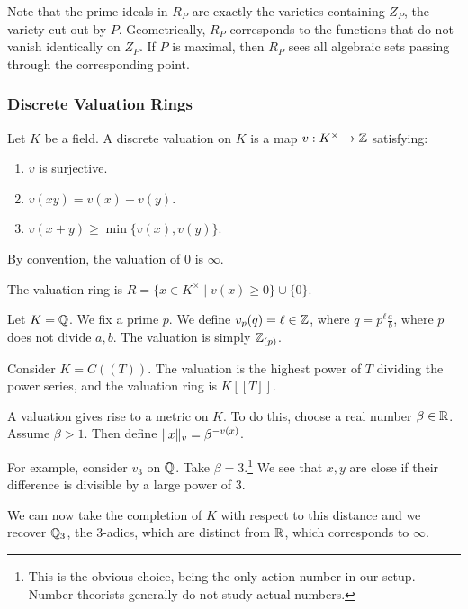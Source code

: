 \documentclass[10pt, twoside]{article}
\begin{document}
        Note that the prime ideals in $R_P$ are exactly the varieties containing $Z_P$, the variety cut out by $P$. Geometrically, $R_P$ corresponds to the functions that do not vanish identically on $Z_P$. If $P$ is maximal, then $R_P$ sees all algebraic sets passing through the corresponding point.

        \subsubsection{Discrete Valuation Rings}
        \begin{defn}
            Let $K$ be a field. A discrete valuation on $K$ is a map $v:K^{\times} \to \mathbb{Z}$ satisfying:
            \begin{enumerate}
                \item $v$ is surjective.
                \item $v(xy) = v(x)+v(y)$.
                \item $v(x+y) \geq \min\{v(x),v(y)\}$.
            \end{enumerate}
            By convention, the valuation of $0$ is $\infty$.

            The valuation ring is $R = \{x \in K^{\times} \mid v(x) \geq 0 \} \cup \{0\}$.
        \end{defn}

        \begin{exm}
            Let $K = \mathbb{Q}$. We fix a prime $p$. We define $v_p(q) = \ell \in \mathbb{Z}$, where $q = p^{\ell}\frac{a}{b}$, where $p$ does not divide $a,b$. The valuation is simply $\mathbb{Z}_{(p)}$.
        \end{exm}

        \begin{exm}
            Consider $K = C((T))$. The valuation is the highest power of $T$ dividing the power series, and the valuation ring is $K[[T]]$.
        \end{exm}

        A valuation gives rise to a metric on $K$. To do this, choose a real number $\beta \in \mathbb{R}$. Assume $\beta > 1$. Then define $\lVert x\rVert_v = \beta^{-v(x)}$. 
        
        \begin{exm}
            For example, consider $v_3$ on $\mathbb{Q}$. Take $\beta = 3$.\footnote{This is the obvious choice, being the only action number in our setup. Number theorists generally do not study actual numbers.} We see that $x,y$ are close if their difference is divisible by a large power of $3$.

            We can now take the completion of $K$ with respect to this distance and we recover $\mathbb{Q}_3$, the $3$-adics, which are distinct from $\mathbb{R}$, which corresponds to $\infty$.
        \end{exm}
\end{document}
